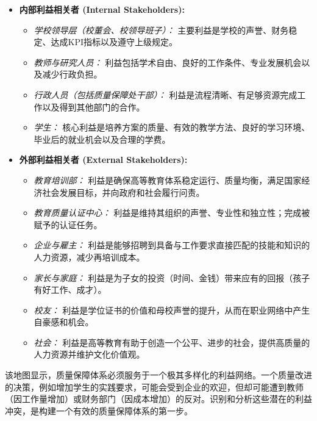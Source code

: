\begin{itemize}
    \item \textbf{内部利益相关者 (Internal Stakeholders):}
        \begin{itemize}
            \item \textit{学校领导层（校董会、校领导班子）：} 主要利益是学校的声誉、财务稳定、达成KPI指标以及遵守上级规定。
            \item \textit{教师与研究人员：} 利益包括学术自由、良好的工作条件、专业发展机会以及减少行政负担。
            \item \textit{行政人员（包括质量保障处干部）：} 利益是流程清晰、有足够资源完成工作以及得到其他部门的合作。
            \item \textit{学生：} 核心利益是培养方案的质量、有效的教学方法、良好的学习环境、毕业后的就业机会以及合理的学费。
        \end{itemize}
    \item \textbf{外部利益相关者 (External Stakeholders):}
        \begin{itemize}
            \item \textit{教育培训部：} 利益是确保高等教育体系稳定运行、质量均衡，满足国家经济社会发展目标，并向政府和社会履行问责。
            \item \textit{教育质量认证中心：} 利益是维持其组织的声誉、专业性和独立性；完成被赋予的认证任务。
            \item \textit{企业与雇主：} 利益是能够招聘到具备与工作要求直接匹配的技能和知识的人力资源，减少再培训成本。
            \item \textit{家长与家庭：} 利益是为子女的投资（时间、金钱）带来应有的回报（孩子有好工作、成才）。
            \item \textit{校友：} 利益是学位证书的价值和母校声誉的提升，从而在职业网络中产生自豪感和机会。
            \item \textit{社会：} 利益是高等教育有助于创造一个公平、进步的社会，提供高质量的人力资源并维护文化价值观。
        \end{itemize}
\end{itemize}
该地图显示，质量保障体系必须服务于一个极其多样化的利益网络。一个质量改进的决策，例如增加学生的实践要求，可能会受到企业的欢迎，但却可能遭到教师（因工作量增加）或财务部门（因成本增加）的反对。识别和分析这些潜在的利益冲突，是构建一个有效的质量保障体系的第一步。






